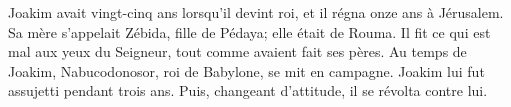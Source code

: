 Joakim avait vingt-cinq ans lorsqu’il devint roi, et il régna onze ans à Jérusalem.
	Sa mère s’appelait Zébida, fille de Pédaya; elle était de Rouma.
Il fit ce qui est mal aux yeux du Seigneur, tout comme avaient fait ses pères.
Au temps de Joakim, Nabucodonosor, roi de Babylone, se mit en campagne.
Joakim lui fut assujetti pendant trois ans.
	Puis, changeant d’attitude, il se révolta contre lui.
